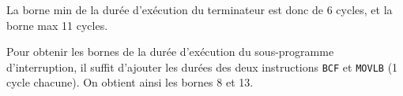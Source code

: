La borne min de la durée d'exécution du terminateur est donc de 6 cycles, et la borne max 11 cycles.

Pour obtenir les bornes de la durée d'exécution du sous-programme d'interruption, il suffit d'ajouter les durées des deux instructions \texttt{BCF} et \texttt{MOVLB} (1 cycle chacune). On obtient ainsi les bornes 8 et 13.






















%
%
%
%
%
